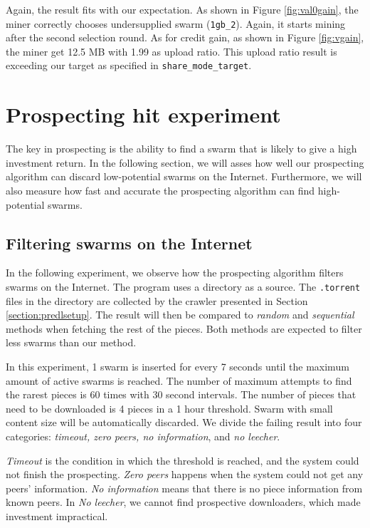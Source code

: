 Again, the result fits with our expectation. As shown in Figure \ref{fig:val0gain}, the miner correctly chooses undersupplied swarm (\texttt{1gb\_2}). Again, it starts mining after the second selection round. As for credit gain, as shown in Figure \ref{fig:vgain}, the miner get 12.5 MB with 1.99 as upload ratio. This upload ratio result is exceeding our target as specified in \texttt{share\_mode\_target}. 
\vspace{-0.3cm}
\section{Prospecting hit experiment}
\label{section:prospectexp}
The key in prospecting is the ability to find a swarm that is likely to give a high investment return. In the following section, we will asses how well our prospecting algorithm can discard low-potential swarms on the Internet. Furthermore, we will also measure how fast and accurate the prospecting algorithm can find high-potential swarms. 

\subsection{Filtering swarms on the Internet}
In the following experiment, we observe how the prospecting algorithm filters swarms on the Internet. The program uses a directory as a source. The \texttt{.torrent} files in the directory are collected by the crawler presented in Section \ref{section:predlsetup}. The result will then be compared to \textit{random} and \textit{sequential} methods when fetching the rest of the pieces. Both methods are expected to filter less swarms than our method.


In this experiment, 1 swarm is inserted for every 7 seconds until the maximum amount of active swarms is reached. The number of maximum attempts to find the rarest pieces is 60 times with 30 second intervals. The number of pieces that need to be downloaded is 4 pieces in a 1 hour threshold. Swarm with small content size will be automatically discarded. We divide the failing result into four categories: \textit{timeout, zero peers, no information}, and \textit{no leecher}.

\textit{Timeout} is the condition in which the threshold is reached, and the system could not finish the prospecting. \textit{Zero peers} happens when the system could not get any peers' information. \textit{No information} means that there is no piece information from known peers. In \textit{No leecher}, we cannot find prospective downloaders, which made investment impractical. 

